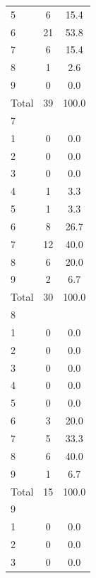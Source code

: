 {\begin{tabular}{l*{1}{cc}}
5           &           6&        15.4\\
6           &          21&        53.8\\
7           &           6&        15.4\\
8           &           1&         2.6\\
9           &           0&         0.0\\
Total       &          39&       100.0\\
\hline
7           &            &            \\
1           &           0&         0.0\\
2           &           0&         0.0\\
3           &           0&         0.0\\
4           &           1&         3.3\\
5           &           1&         3.3\\
6           &           8&        26.7\\
7           &          12&        40.0\\
8           &           6&        20.0\\
9           &           2&         6.7\\
Total       &          30&       100.0\\
\hline
8           &            &            \\
1           &           0&         0.0\\
2           &           0&         0.0\\
3           &           0&         0.0\\
4           &           0&         0.0\\
5           &           0&         0.0\\
6           &           3&        20.0\\
7           &           5&        33.3\\
8           &           6&        40.0\\
9           &           1&         6.7\\
Total       &          15&       100.0\\
\hline
9           &            &            \\
1           &           0&         0.0\\
2           &           0&         0.0\\
3           &           0&         0.0\\

\end{tabular}}
